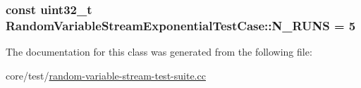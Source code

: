 \subsubsection[{\texorpdfstring{N\+\_\+\+R\+U\+NS}{N_RUNS}}]{\setlength{\rightskip}{0pt plus 5cm}const uint32\+\_\+t Random\+Variable\+Stream\+Exponential\+Test\+Case\+::\+N\+\_\+\+R\+U\+NS = 5\hspace{0.3cm}{\ttfamily [static]}}\hypertarget{classRandomVariableStreamExponentialTestCase_a069ef5f86a9882cdd7cc6c4c281825ee}{}\label{classRandomVariableStreamExponentialTestCase_a069ef5f86a9882cdd7cc6c4c281825ee}


The documentation for this class was generated from the following file\+:\begin{DoxyCompactItemize}
\item 
core/test/\hyperlink{random-variable-stream-test-suite_8cc}{random-\/variable-\/stream-\/test-\/suite.\+cc}\end{DoxyCompactItemize}
